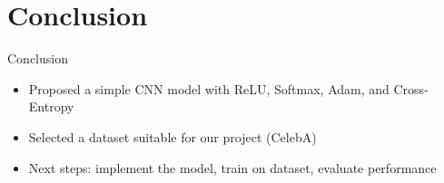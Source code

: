 \documentclass{beamer}
\begin{document}
\section{Conclusion}

\begin{frame}{Conclusion}
\begin{itemize}
    \item Proposed a simple CNN model with ReLU, Softmax, Adam, and Cross-Entropy
    \item Selected a dataset suitable for our project (CelebA)
    \item Next steps: implement the model, train on dataset, evaluate performance
\end{itemize}
\end{frame}
\end{document}
